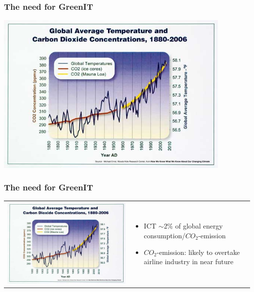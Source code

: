 \begin{frame}
  \frametitle{The need for GreenIT}
  \begin{center} 
   \includegraphics[width=0.87\textwidth]{images/co2temp.jpg} 
  \end{center} 
\end{frame}


\begin{frame}
  \frametitle{The need for GreenIT}
\begin{tabular}{ll}
\begin{minipage}[c]{0.3\textwidth}
\includegraphics[width=\textwidth]{images/co2temp.jpg}
\end{minipage}
&
\begin{minipage}[c]{0.7\textwidth}
  \begin{itemize}
   \item ICT $\sim$2\% of global energy consumption/$CO_2$-emission
   \item $CO_2$-emission: likely to overtake airline industry in near future
  \end{itemize}
\end{minipage}
\end{tabular}
\end{frame}


